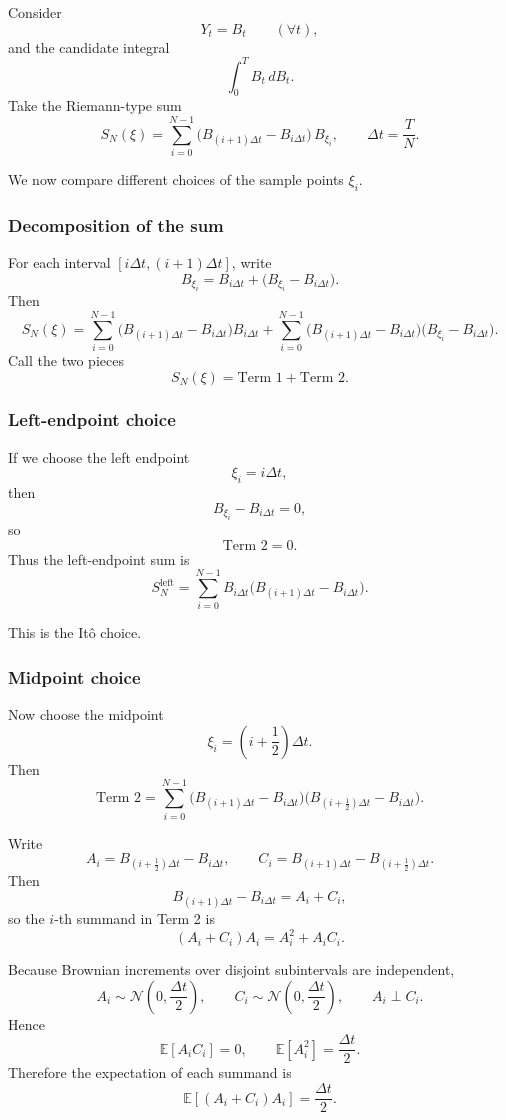 \documentclass[11pt]{article}
\theoremstyle{definition}
\begin{document}
Consider
\[
Y_t=B_t
\qquad (\forall t),
\]
and the candidate integral
\[
\int_0^T B_t\,dB_t.
\]
Take the Riemann-type sum
\[
S_N(\xi)
=
\sum_{i=0}^{N-1}
\bigl(B_{(i+1)\Delta t}-B_{i\Delta t}\bigr)\,B_{\xi_i},
\qquad
\Delta t=\frac{T}{N}.
\]

We now compare different choices of the sample points \(\xi_i\).

\subsubsection{Decomposition of the sum}

For each interval \([i\Delta t,(i+1)\Delta t]\), write
\[
B_{\xi_i}
=
B_{i\Delta t}+\bigl(B_{\xi_i}-B_{i\Delta t}\bigr).
\]
Then
\[
S_N(\xi)
=
\sum_{i=0}^{N-1}
\bigl(B_{(i+1)\Delta t}-B_{i\Delta t}\bigr)B_{i\Delta t}
+
\sum_{i=0}^{N-1}
\bigl(B_{(i+1)\Delta t}-B_{i\Delta t}\bigr)\bigl(B_{\xi_i}-B_{i\Delta t}\bigr).
\]
Call the two pieces
\[
S_N(\xi)=\text{Term 1}+\text{Term 2}.
\]

\subsubsection{Left-endpoint choice}

If we choose the left endpoint
\[
\xi_i=i\Delta t,
\]
then
\[
B_{\xi_i}-B_{i\Delta t}=0,
\]
so
\[
\text{Term 2}=0.
\]
Thus the left-endpoint sum is
\[
S_N^{\mathrm{left}}
=
\sum_{i=0}^{N-1}
B_{i\Delta t}\bigl(B_{(i+1)\Delta t}-B_{i\Delta t}\bigr).
\]

This is the It\^o choice.

\subsubsection{Midpoint choice}

Now choose the midpoint
\[
\xi_i=\left(i+\frac12\right)\Delta t.
\]
Then
\[
\text{Term 2}
=
\sum_{i=0}^{N-1}
\bigl(B_{(i+1)\Delta t}-B_{i\Delta t}\bigr)
\bigl(B_{(i+\frac12)\Delta t}-B_{i\Delta t}\bigr).
\]

Write
\[
A_i=B_{(i+\frac12)\Delta t}-B_{i\Delta t},
\qquad
C_i=B_{(i+1)\Delta t}-B_{(i+\frac12)\Delta t}.
\]
Then
\[
B_{(i+1)\Delta t}-B_{i\Delta t}=A_i+C_i,
\]
so the \(i\)-th summand in Term 2 is
\[
(A_i+C_i)A_i=A_i^2+A_iC_i.
\]

Because Brownian increments over disjoint subintervals are independent,
\[
A_i\sim \mathcal N\!\left(0,\frac{\Delta t}{2}\right),
\qquad
C_i\sim \mathcal N\!\left(0,\frac{\Delta t}{2}\right),
\qquad
A_i \perp C_i.
\]
Hence
\[
\mathbb E[A_iC_i]=0,
\qquad
\mathbb E[A_i^2]=\frac{\Delta t}{2}.
\]
Therefore the expectation of each summand is
\[
\mathbb E[(A_i+C_i)A_i]=\frac{\Delta t}{2}.
\]
\end{document}
